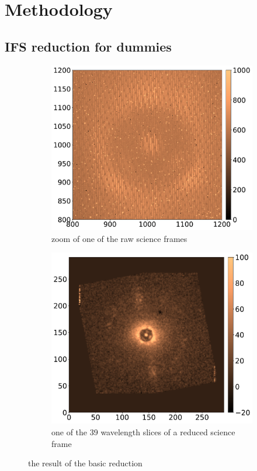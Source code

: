 \documentclass[twoside,single]{lion-msc}
\begin{document}
\chapter{Methodology}
\section{IFS reduction for dummies}
\begin{figure}[!b]
\centering
\begin{subfigure}{.48\textwidth}
  \centering
  \includegraphics[width=1\linewidth]{rawframe}
  \caption{zoom of one of the raw science frames}
  \label{fig:rawdata}
\end{subfigure}\hfill
\begin{subfigure}{.48\textwidth}
  \centering
  \includegraphics[width=1\linewidth]{reducedframe}
  \caption{one of the 39 wavelength slices of a reduced science frame}
  \label{fig:reduceddata}
\end{subfigure}
\caption{the result of the basic reduction}
\label{fig:datareduction}
\end{figure}
\end{document}
